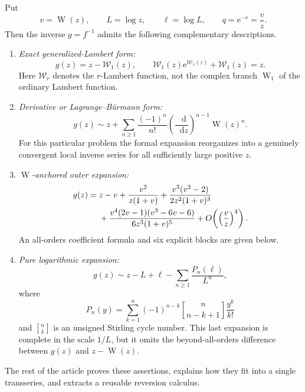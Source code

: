 \documentclass[11pt,oneside]{article}
\theoremstyle{plain}
\theoremstyle{definition}
\theoremstyle{remark}
\newcommand{\W}{\operatorname{W}}
\newcommand{\rW}{\mathcal{W}}
\newcommand{\e}{\mathrm{e}}
\newcommand{\dd}{\mathop{}\!\mathrm{d}}
\begin{document}
\begin{mainbox}
Put
\[
 v=\W(z),\qquad L=\log z,
 \qquad \ell=\log L,
 \qquad q=\e^{-v}=\frac{v}{z}.
\]
Then the inverse \(g=f^{-1}\) admits the following complementary descriptions.
\begin{enumerate}
\item \emph{Exact generalized-Lambert form:}
\[
 g(z)=z-\rW_1(z),
 \qquad \rW_1(z)\e^{\rW_1(z)}+\rW_1(z)=z.
\]
Here \(\rW_r\) denotes the \(r\)-Lambert function, not the complex branch
\(\W_1\) of the ordinary Lambert function.

\item \emph{Derivative or Lagrange--B\"urmann form:}
\begin{equation}
 g(z)\sim z+\sum_{n\ge1}\frac{(-1)^n}{n!}
 \left(\frac{\dd}{\dd z}\right)^{n-1}\W(z)^n.
 \label{eq:derivative-main}
\end{equation}
For this particular problem the formal expansion reorganizes into a genuinely
convergent local inverse series for all sufficiently large positive \(z\).

\item \emph{\(\W\)-anchored outer expansion:}
\begin{align}
 g(z)={}&z-v+\frac{v^2}{z(1+v)}
 +\frac{v^3(v^2-2)}{2z^2(1+v)^3}\notag\\
 &+\frac{v^4(2v-1)(v^3-6v-6)}{6z^3(1+v)^5}
 +O\!\left(\left(\frac{v}{z}\right)^4\right).
 \label{eq:anchored-first}
\end{align}
An all-orders coefficient formula and six explicit blocks are given below.

\item \emph{Pure logarithmic expansion:}
\begin{equation}
 g(z)\sim z-L+\ell-\sum_{n\ge1}\frac{P_n(\ell)}{L^n},
 \label{eq:pure-log-main}
\end{equation}
where
\begin{equation}
 P_n(y)=\sum_{k=1}^{n}(-1)^{n-k}
 \genfrac{[}{]}{0pt}{}{n}{n-k+1}\frac{y^k}{k!}
 \label{eq:Pn-stirling}
\end{equation}
and \(\genfrac{[}{]}{0pt}{}{n}{k}\) is an unsigned Stirling cycle number.
This last expansion is complete in the scale \(1/L\), but it omits the
beyond-all-orders difference between \(g(z)\) and \(z-\W(z)\).
\end{enumerate}
\end{mainbox}

The rest of the article proves these assertions, explains how they fit into a
single transseries, and extracts a reusable reversion calculus.
\end{document}
